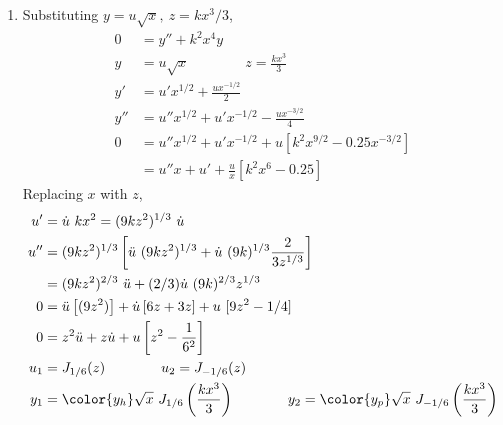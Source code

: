 \begin{enumerate}
    \item Substituting $ y = u\sqrt{x},\ z = kx^3/3 $,
          \begin{align}
              0   & = y'' + k^2x^4 y                                 \\
              y   & = u \sqrt{x} \qquad\qquad z = \frac{kx^3}{3}     \\
              y'  & = u'x^{1/2} + \frac{ux^{-1/2}}{2}                \\
              y'' & = u'' x^{1/2} + u'x^{-1/2} - \frac{ux^{-3/2}}{4} \\
              0   & = u'' x^{1/2} + u'x^{-1/2}
              + u\left[ k^2x^{9/2} - 0.25x^{-3/2} \right]            \\
                  & = u''x + u' + \frac{u}{x} [k^2x^6 - 0.25]
          \end{align}
          Replacing $ x $ with $ z $,
          \begin{align}
              u'  & = \dot{u}\ kx^2 = (9kz^2)^{1/3}\ \dot{u}                        \\
              u'' & = (9kz^2)^{1/3} \left[ \ddot{u}\ (9kz^2)^{1/3}
              + \dot{u}\ (9k)^{1/3} \frac{2}{3z^{1/3}} \right]                      \\
                  & = (9kz^2)^{2/3}\ \ddot{u} + (2/3)\dot{u}\ (9k)^{2/3}z^{1/3}     \\
              0   & = \ddot{u} \left[ (9z^2) \right]
              + \dot{u} \left[ 6z + 3z \right] + u\ [9z^2 - 1/4]                    \\
              0   & =z^2 \ddot{u} + z\dot{u} + u \left[ z^2 - \frac{1}{6^2} \right] \\
              u_1 & = J_{1/6}(z) \qquad\qquad u_2 = J_{-1/6}(z)                     \\
              y_1 & ={\color{y_h} \sqrt{x}\  J_{1/6}
              \left( \frac{kx^{3}}{3} \right)} \qquad\qquad
              y_2 = {\color{y_p} \sqrt{x}\ J_{-1/6}
              \left( \frac{kx^{3}}{3} \right)}
          \end{align}


\end{enumerate}
